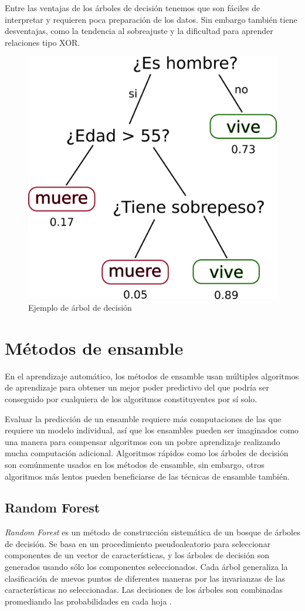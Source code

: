 Entre las ventajas de los árboles de decisión tenemos que son fáciles de interpretar y requieren poca preparación de los datos. Sin embargo también tiene desventajas, como la tendencia al sobreajuste y la dificultad para aprender relaciones tipo XOR.

\begin{figure}[htbp]
	\centering
	\includegraphics[width=0.4\linewidth]{graficos/propios/arbol_decision.png}
	\caption{Ejemplo de árbol de decisión}
	\label{fig:dt-eg}
\end{figure}

\section{Métodos de ensamble}

En el aprendizaje automático, los métodos de ensamble usan múltiples algoritmos de aprendizaje para obtener un mejor poder predictivo del que podría ser conseguido por cualquiera de los algoritmos constituyentes por sí solo.

Evaluar la predicción de un ensamble requiere más computaciones de las que requiere un modelo individual, así que los ensambles pueden ser imaginados como una manera para compensar algoritmos con un pobre aprendizaje realizando mucha computación adicional. Algoritmos rápidos como los árboles de decisión son comúnmente usados en los métodos de ensamble, sin embargo, otros algoritmos más lentos pueden beneficiarse de las técnicas de ensamble también.

\subsection{Random Forest}

\textit{Random Forest} es un método de construcción sistemática de un bosque de árboles de decisión. Se basa en un procedimiento pseudoaleatorio para seleccionar componentes de un vector de características, y los árboles de decisión son generados usando sólo los componentes seleccionados. Cada árbol generaliza la clasificación de nuevos puntos de diferentes maneras por las invarianzas de las características no seleccionadas. Las decisiones de los árboles son combinadas promediando las probabilidades en cada hoja \citep{ho1998random}.

